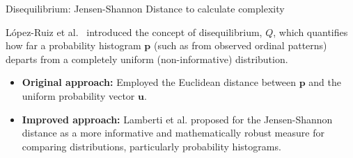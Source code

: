 \documentclass{beamer}
\begin{document}


	

\begin{frame}{Disequilibrium: Jensen-Shannon Distance to calculate complexity}
	
	López-Ruiz et al.~\cite{lopez1995statistical} introduced the concept of \alert{disequilibrium, $Q$}, which quantifies how far a probability histogram $\mathbf{p}$ (such as from observed ordinal patterns) departs from a completely uniform (non-informative) distribution.
	
	\begin{itemize}
		\item \textbf{Original approach:} Employed the \alert{Euclidean distance} between $\mathbf{p}$ and the uniform probability vector $\mathbf{u}$.
		\item \textbf{Improved approach:} Lamberti et al.\cite{lamberti2004intensive} proposed for the \alert{Jensen-Shannon distance} as a more informative and mathematically robust measure for comparing distributions, particularly probability histograms.
	\end{itemize}
\end{frame}	
\end{document}
